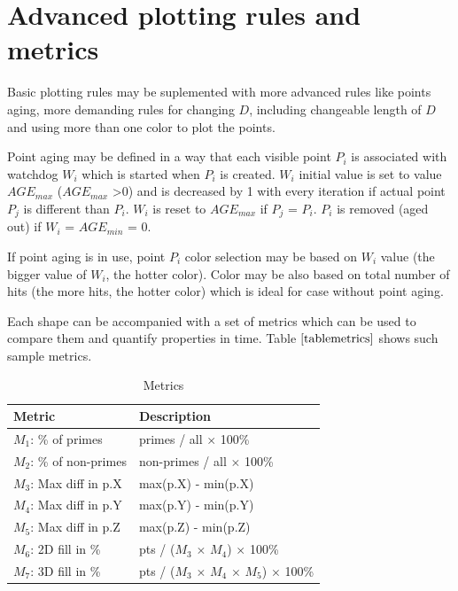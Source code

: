 \documentclass[10pt,twocolumn]{article}
\begin{document}
\section{Advanced plotting rules and metrics}

Basic plotting rules may be suplemented with more advanced rules like points aging, more demanding rules for changing $D$, including changeable length of $D$ and using more than one color to plot the points. \par
Point aging may be defined in a way that each visible point $P_i$ is associated with watchdog $W_i$ which is started when $P_i$ is created. $W_i$ initial value is set to value $AGE_{max}$ ($AGE_{max}$ \textgreater 0) and is decreased by 1 with every iteration if actual point $P_j$ is different than $P_i$. $W_i$ is reset to $AGE_{max}$ if $P_j$ = $P_i$. $P_i$ is removed (aged out) if $W_i$ = $AGE_{min}$ = 0. \par
If point aging is in use, point $P_i$ color selection may be based on $W_i$ value (the bigger value of $W_i$, the hotter color). Color may be also based on total number of hits (the more hits, the hotter color) which is ideal for case without point aging. \par
Each shape can be accompanied with a set of metrics which can be used to compare them and quantify properties in time. Table $\ref{tablemetrics}$ shows such sample metrics.

\begin{table}[h]
\centering
\caption{Metrics}
\label{tablemetrics}
\begin{tabular}{|l|l|}
  \hline 
  \rowcolor{LightCyan}
   Metric & Description\\
  \hline 
  $M_1$: \% of primes &  primes / all $\times$ 100\% \\
  \hline 
  $M_2$: \% of non-primes &  non-primes / all $\times$ 100\%\\
  \hline 
  $M_3$: Max diff in p.X & max(p.X) - min(p.X) \\
  \hline 
  $M_4$: Max diff in p.Y & max(p.Y) - min(p.Y) \\
  \hline 
  $M_5$: Max diff in p.Z & max(p.Z) - min(p.Z) \\
  \hline 
  $M_6$: 2D fill in \% & pts / ($M_3$ $\times$ $M_4$) $\times$ 100\% \\
  \hline 
  $M_7$: 3D fill in \% & pts / ($M_3$ $\times$ $M_4$ $\times$ $M_5$) $\times$ 100\% \\
  \hline 
\end{tabular} 
\end{table}
\end{document}
